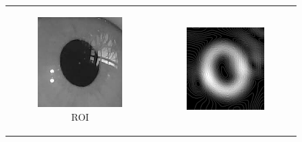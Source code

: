 \begin{figure}[h]
    \centering
    \begin{tabular}{cc}
        \centering
        \begin{subfigure}{0.3\textwidth}
            \centering
            \includegraphics[width=0.9\linewidth]{plots/eye_dataset/roi.png}
            \caption{ROI}
        \end{subfigure} &
        \begin{subfigure}{0.3\textwidth}
            \centering
            \includegraphics[width=0.9\linewidth]{plots/eye_dataset/mag.png}

\end{subfigure}
\end{tabular}
\end{figure}
